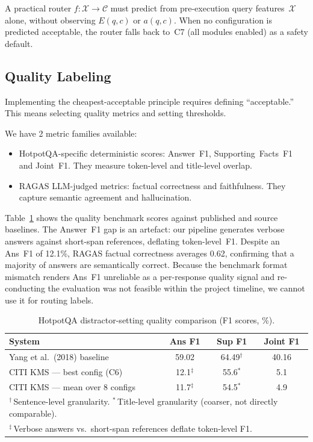 A practical router $f: \mathcal{X} \to \mathcal{C}$ must predict from
pre-execution query features~$\mathcal{X}$ alone, without observing $E(q,c)$ or
$a(q,c)$. When no configuration is predicted acceptable, the router falls back
to~C7 (all modules enabled) as a safety default.


\subsection{Quality Labeling}
\label{subsec:quality-labeling}

Implementing the cheapest-acceptable principle requires defining
``acceptable.'' This means selecting quality metrics and setting thresholds.

We have 2 metric families available: 
\begin{itemize}
      \item HotpotQA-specific deterministic scores: Answer~F1, Supporting~Facts~F1 and
Joint~F1. They measure token-level and title-level overlap. 
      \item RAGAS LLM-judged metrics: factual correctness and
faithfulness. They capture semantic agreement and hallucination.

\end{itemize}

Table~\ref{tab:hotpot-comparison} shows the quality benchmark scores against
published and source baselines. The Answer~F1 gap is an artefact: our pipeline
generates verbose answers against short-span references, deflating
token-level~F1. Despite an Ans~F1 of 12.1\%, RAGAS factual correctness
averages 0.62, confirming that a majority of answers are semantically correct.
Because the benchmark format mismatch renders Ans~F1 unreliable as a
per-response quality signal and re-conducting the evaluation was not feasible
within the project timeline, we cannot use it for routing labels.

\begin{table}[h!]
\centering
\begin{tabular}{l c c c}
\hline
\textbf{System} & \textbf{Ans F1} & \textbf{Sup F1} & \textbf{Joint F1} \\
\hline
Yang et al.\ (2018) baseline~\cite{hotpotqa2018}
    & 59.02 & 64.49$^\dagger$ & 40.16 \\
\hline
CITI KMS --- best config (C6)
    & 12.1$^\ddagger$ & 55.6$^*$ & 5.1 \\
CITI KMS --- mean over 8 configs
    & 11.7$^\ddagger$ & 54.5$^*$ & 4.9 \\
\hline
\multicolumn{4}{l}{\footnotesize $^\dagger$\,Sentence-level granularity. \;
    $^*$\,Title-level granularity (coarser, not directly comparable).} \\
\multicolumn{4}{l}{\footnotesize $^\ddagger$\,Verbose answers vs.\ short-span references deflate token-level F1.}
\end{tabular}
\caption{HotpotQA distractor-setting quality comparison (F1 scores, \%).}
\label{tab:hotpot-comparison}
\end{table}


